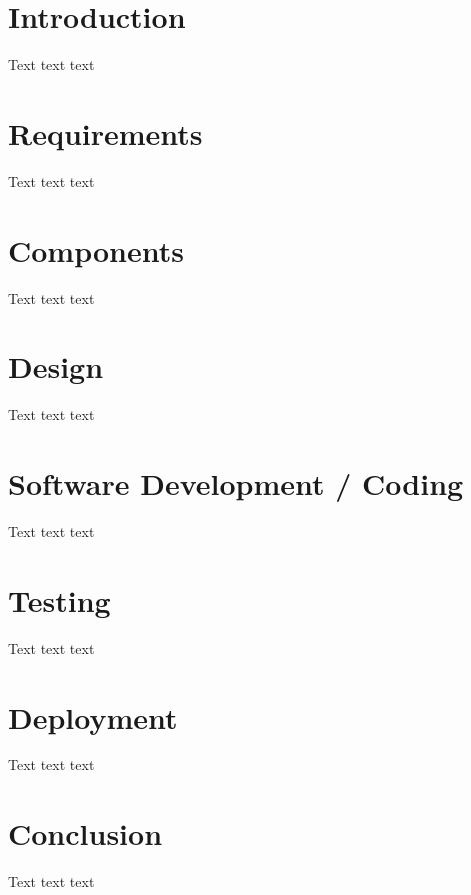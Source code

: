 \documentclass[12pt]{article}
\begin{document}
\clearpage
\singlespacing
\tableofcontents  %
\clearpage
\listoffigures    %
\listoftables     %
\listofalgorithms %
\clearpage
\onehalfspacing

\section{Introduction}
Text text text 

\section{Requirements}
Text text text

\section{Components}
Text text text

\section{Design}
Text text text

\section{Software Development / Coding}
Text text text

\section{Testing}
Text text text

\section{Deployment}
Text text text

\section{Conclusion}
Text text text


\clearpage
{}
\singlespacing %
\printbibliography
\end{document}
